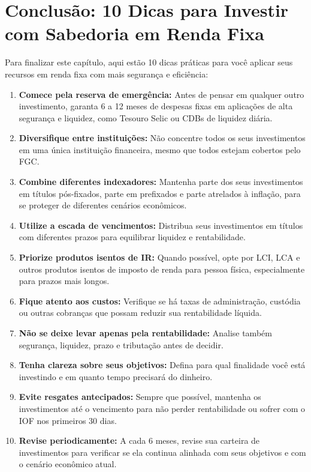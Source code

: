 \section{Conclusão: 10 Dicas para Investir com Sabedoria em Renda Fixa}
\noindent Para finalizar este capítulo, aqui estão 10 dicas práticas para você aplicar seus recursos em renda fixa com mais segurança e eficiência:

\begin{enumerate}
    \item \textbf{Comece pela reserva de emergência:} Antes de pensar em qualquer outro investimento, garanta 6 a 12 meses de despesas fixas em aplicações de alta segurança e liquidez, como Tesouro Selic ou CDBs de liquidez diária.
    
    \item \textbf{Diversifique entre instituições:} Não concentre todos os seus investimentos em uma única instituição financeira, mesmo que todos estejam cobertos pelo FGC.
    
    \item \textbf{Combine diferentes indexadores:} Mantenha parte dos seus investimentos em títulos pós-fixados, parte em prefixados e parte atrelados à inflação, para se proteger de diferentes cenários econômicos.
    
    \item \textbf{Utilize a escada de vencimentos:} Distribua seus investimentos em títulos com diferentes prazos para equilibrar liquidez e rentabilidade.
    
    \item \textbf{Priorize produtos isentos de IR:} Quando possível, opte por LCI, LCA e outros produtos isentos de imposto de renda para pessoa física, especialmente para prazos mais longos.
    
    \item \textbf{Fique atento aos custos:} Verifique se há taxas de administração, custódia ou outras cobranças que possam reduzir sua rentabilidade líquida.
    
    \item \textbf{Não se deixe levar apenas pela rentabilidade:} Analise também segurança, liquidez, prazo e tributação antes de decidir.
    
    \item \textbf{Tenha clareza sobre seus objetivos:} Defina para qual finalidade você está investindo e em quanto tempo precisará do dinheiro.
    
    \item \textbf{Evite resgates antecipados:} Sempre que possível, mantenha os investimentos até o vencimento para não perder rentabilidade ou sofrer com o IOF nos primeiros 30 dias.
    
    \item \textbf{Revise periodicamente:} A cada 6 meses, revise sua carteira de investimentos para verificar se ela continua alinhada com seus objetivos e com o cenário econômico atual.
\end{enumerate}


